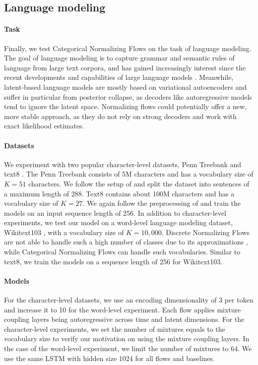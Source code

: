 \subsection{Language modeling}
\label{sec:experiments_language_modeling}

\paragraph{Task} Finally, we test Categorical Normalizing Flows on the task of language modeling. 
The goal of language modeling is to capture grammar and semantic rules of language from large text corpora, and has gained increasingly interest since the recent developments and capabilities of large language models \cite{BERT, GPT2, GPT3}.
Meanwhile, latent-based language models are mostly based on variational autoencoders and suffer in particular from posterior collapse, as decoders like autoregressive models tend to ignore the latent space.
Normalizing flows could potentially offer a new, more stable approach, as they do not rely on strong decoders and work with exact likelihood estimates. 


\paragraph{Datasets} We experiment with two popular character-level datasets, Penn Treebank \cite{PennTreeBank} and text8 \cite{text8}. 
The Penn Treebank consists of 5M characters and has a vocabulary size of $K=51$ characters.
We follow the setup of \citet{SemiDiscreteNFSequence} and split the dataset into sentences of a maximum length of 288. 
Text8 contains about 100M characters and has a vocabulary size of $K=27$. 
We again follow the preprocessing of \citet{mikolov2012subword} and train the models on an input sequence length of 256.
In addition to character-level experiments, we test our model on a word-level language modeling dataset, Wikitext103 \cite{Wikitext}, with a vocabulary size of $K=10,000$. 
Discrete Normalizing Flows are not able to handle such a high number of classes due to its approximations \cite{TranDiscreteFlows}, while Categorical Normalizing Flows can handle such vocabularies. 
Similar to text8, we train the models on a sequence length of 256 for Wikitext103.

\paragraph{Models} For the character-level datasets, we use an encoding dimensionality of 3 per token and increase it to 10 for the word-level experiment.
Each flow applies mixture coupling layers being autoregressive across time and latent dimensions. 
For the character-level experiments, we set the number of mixtures equals to the vocabulary size to verify our motivation on using the mixture coupling layers. 
In the case of the word-level experiment, we limit the number of mixtures to $64$.
We use the same LSTM \cite{LSTM} with hidden size 1024 for all flows and baselines. 

